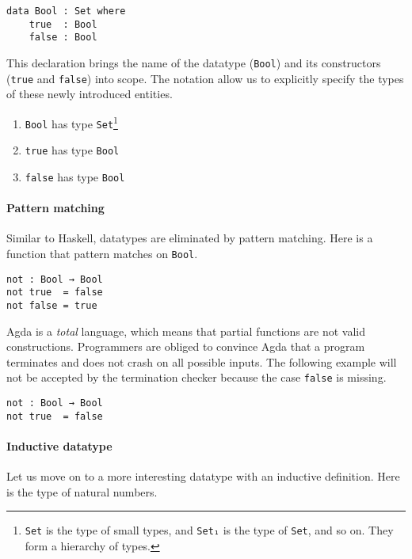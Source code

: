 \documentclass[\main/thesis.tex]{subfiles}
\begin{document}
\begin{lstlisting}
data Bool : Set where
    true  : Bool
    false : Bool
\end{lstlisting}

This declaration brings the name of the datatype ({\lstinline|Bool|})
and its constructors ({\lstinline|true|} and {\lstinline|false|}) into scope.
The notation allow us to explicitly specify the types of these newly introduced
entities.

\begin{enumerate}
    \item {\lstinline|Bool|} has type {\lstinline|Set|}\footnote{{\lstinline|Set|} is the type of small types, and {\lstinline|Set₁|} is the type
of {\lstinline|Set|}, and so on. They form a hierarchy of types.}
    \item {\lstinline|true|} has type {\lstinline|Bool|}
    \item {\lstinline|false|} has type {\lstinline|Bool|}
\end{enumerate}

\paragraph{Pattern matching}

Similar to Haskell, datatypes are eliminated by pattern matching.
Here is a function that pattern matches on {\lstinline|Bool|}.

\begin{lstlisting}
not : Bool → Bool
not true  = false
not false = true
\end{lstlisting}

Agda is a \textit{total} language,
which means that partial functions are not valid constructions.
Programmers are obliged to convince Agda that a program terminates and does not
crash on all possible inputs.
The following example will not be accepted by the termination checker because the
case {\lstinline|false|} is missing.

\begin{lstlisting}
not : Bool → Bool
not true  = false
\end{lstlisting}

\paragraph{Inductive datatype} Let us move on to a more interesting datatype with
an inductive definition. Here is the type of natural numbers.
\end{document}
